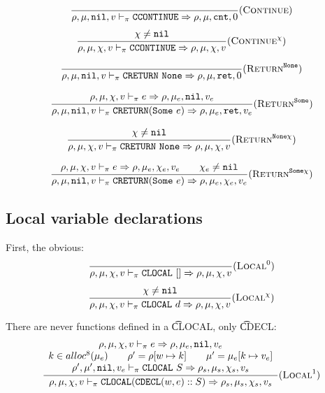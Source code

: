 \[\dfrac{
}{\rho,\mu,\texttt{nil},v \vdash_\pi \texttt{CCONTINUE} \Rightarrow \rho,\mu,\texttt{cnt},0} (\textsc{Continue})\]
\[\dfrac{\begin{array}{c}
    \chi\ne\texttt{nil}
\end{array}}{\rho,\mu,\chi,v \vdash_\pi \texttt{CCONTINUE} \Rightarrow \rho,\mu,\chi,v} (\textsc{Continue}^\chi)\]

\[\dfrac{
}{\rho,\mu,\texttt{nil},v \vdash_\pi \texttt{CRETURN}\ \texttt{None} \Rightarrow \rho,\mu,\texttt{ret},0} (\textsc{Return}^{\texttt{None}})\]

\[\dfrac{\begin{array}{c}
    \rho,\mu,\chi,v \vdash_\pi e \Rightarrow \rho,\mu_e,\texttt{nil},v_e
\end{array}}{\rho,\mu,\texttt{nil},v \vdash_\pi \texttt{CRETURN}(\texttt{Some}\ e) \Rightarrow \rho,\mu_e,\texttt{ret},v_e} (\textsc{Return}^{\texttt{Some}})\]

\[\dfrac{\begin{array}{c}
    \chi\ne\texttt{nil}
\end{array}}{\rho,\mu,\chi,v \vdash_\pi \texttt{CRETURN}\ \texttt{None} \Rightarrow \rho,\mu,\chi,v} (\textsc{Return}^{\texttt{None}\chi})\]

\[\dfrac{\begin{array}{c}
    \rho,\mu,\chi,v \vdash_\pi e \Rightarrow \rho,\mu_e,\chi_e,v_e \qquad \chi_e\ne\texttt{nil}
\end{array}}{\rho,\mu,\texttt{nil},v \vdash_\pi \texttt{CRETURN}(\texttt{Some}\ e) \Rightarrow \rho,\mu_e,\chi_e,v_e} (\textsc{Return}^{\texttt{Some}\chi})\]

\subsection{Local variable declarations}

First, the obvious:
\[\dfrac{\begin{array}{c}
\end{array}}{\rho,\mu,\chi,v \vdash_\pi \texttt{CLOCAL}\ [] \Rightarrow \rho,\mu,\chi,v} (\textsc{Local}^0)\]
\[\dfrac{\begin{array}{c}
    \chi\ne\texttt{nil}
\end{array}}{\rho,\mu,\chi,v \vdash_\pi \texttt{CLOCAL}\ d \Rightarrow \rho,\mu,\chi,v} (\textsc{Local}^\chi)\]

There are never functions defined in a \t{CLOCAL}, only \t{CDECL}:
\[\dfrac{\begin{array}{c}
    \rho,\mu,\chi,v \vdash_\pi e \Rightarrow \rho,\mu_e,\texttt{nil},v_e \\
    k \in alloc^8(\mu_e) \qquad \rho' = \rho[w \mapsto k] \qquad \mu' = \mu_e[k \mapsto v_e] \\
    \rho',\mu',\texttt{nil},v_e \vdash_\pi \texttt{CLOCAL}\ S \Rightarrow \rho_s,\mu_s,\chi_s,v_s
\end{array}}{\rho,\mu,\chi,v \vdash_\pi \texttt{CLOCAL}(\texttt{CDECL}(w,e)::S) \Rightarrow \rho_s,\mu_s,\chi_s,v_s} (\textsc{Local}^1)\]

